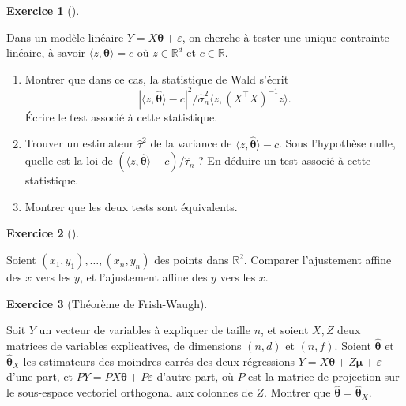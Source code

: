 \documentclass[
  10,
  letterpaper,
  DIV=11,
  numbers=noendperiod]{scrreport}
\providecommand{\tightlist}{%
  \setlength{\itemsep}{0pt}\setlength{\parskip}{0pt}}\usepackage{longtable,booktabs,array}
\newcommand{\bt}{\boldsymbol{\theta}}
\theoremstyle{plain}
\theoremstyle{definition}
\newtheorem{exercise}{Exercice}[chapter]
\theoremstyle{plain}
\theoremstyle{definition}
\theoremstyle{definition}
\theoremstyle{plain}
\theoremstyle{remark}
\begin{document}
\begin{exercise}[]\protect\hypertarget{exr-uniquecontrainte}{}\label{exr-uniquecontrainte}

Dans un modèle linéaire \(Y = X\bt + \varepsilon\), on cherche à tester
une unique contrainte linéaire, à savoir \(\langle z, \bt \rangle = c\)
où \(z \in \mathbb{R}^d\) et \(c \in \mathbb{R}\).

\begin{enumerate}
\def\labelenumi{\arabic{enumi}.}
\tightlist
\item
  Montrer que dans ce cas, la statistique de Wald s'écrit
  \[ |\langle z, \hat{\bt}\rangle - c|^2/\hat{\sigma}_n^2\langle z, (X^\top X)^{-1}z\rangle.\]
  Écrire le test associé à cette statistique.
\item
  Trouver un estimateur \(\hat{\tau}^2\) de la variance de
  \(\langle z, \hat{\bt}\rangle -c\). Sous l'hypothèse nulle, quelle est
  la loi de \((\langle z, \hat{\bt}\rangle -c)/\hat{\tau}_n\) ? En
  déduire un test associé à cette statistique.
\item
  Montrer que les deux tests sont équivalents.
\end{enumerate}

\end{exercise}

\begin{exercise}[]\protect\hypertarget{exr-aju}{}\label{exr-aju}

Soient \((x_1, y_1), \dotsc, (x_n, y_n)\) des points dans
\(\mathbb{R}^2\). Comparer l'ajustement affine des \(x\) vers les \(y\),
et l'ajustement affine des \(y\) vers les \(x\).

\end{exercise}

\begin{exercise}[Théorème de
Frish-Waugh]\protect\hypertarget{exr-fw}{}\label{exr-fw}

Soit \(Y\) un vecteur de variables à expliquer de taille \(n\), et
soient \(X,Z\) deux matrices de variables explicatives, de dimensions
\((n,d)\) et \((n,f)\). Soient \(\hat{\bt}\) et \(\hat{\bt}_X\) les
estimateurs des moindres carrés des deux régressions
\(Y = X\bt + Z{\boldsymbol \mu} + \varepsilon\) d'une part, et
\(PY = PX\bt + P\varepsilon\) d'autre part, où \(P\) est la matrice de
projection sur le sous-espace vectoriel orthogonal aux colonnes de
\(Z\). Montrer que \(\hat{\bt} = \hat{\bt}_X\).

\end{exercise}
\end{document}
